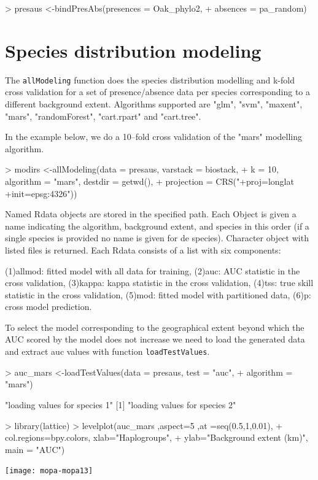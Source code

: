 \documentclass[10pt,a4paper]{report}
\begin{document}
\begin{Schunk}
\begin{Sinput}
> presaus <-bindPresAbs(presences = Oak_phylo2, 
+                       absences = pa_random)
\end{Sinput}
\end{Schunk}


\chapter{Species distribution modeling}


The \texttt{allModeling} function does the species distribution modelling and k-fold cross validation for a set of presence/absence data per species corresponding to a different background 
extent. Algorithms supported are "glm", "svm", "maxent", "mars", "randomForest", "cart.rpart" 
and "cart.tree".

In the example below, we do a 10--fold cross validation of the "mars" modelling algorithm.

\begin{Schunk}
\begin{Sinput}
> modirs <-allModeling(data = presaus, varstack = biostack, 
+               k = 10, algorithm = "mars", destdir = getwd(), 
+               projection = CRS("+proj=longlat +init=epsg:4326"))
\end{Sinput}
\end{Schunk}

Named Rdata objects are stored in the specified path. Each Object is given a name indicating the algorithm, background extent, and species in this order (if a single species is provided no name is given for de species). Character object with listed files is returned. Each Rdata consists of a list with six components:

	(1)allmod: fitted model with all data for training, 
	(2)auc: AUC statistic in the cross validation,
	(3)kappa: kappa statistic in the cross validation,
	(4)tss: true skill statistic in the cross validation,
	(5)mod: fitted model with partitioned data, 
	(6)p: cross model prediction. 


To select the model corresponding to the geographical extent beyond which the AUC scored by the model does not increase we need to load the generated data and extract auc values with function \texttt{loadTestValues}.

\begin{Schunk}
\begin{Sinput}
> auc_mars <-loadTestValues(data = presaus, test = "auc", 
+                           algorithm = "mars")
\end{Sinput}
\begin{Soutput}
[1] "loading values for species 1"
[1] "loading values for species 2"
\end{Soutput}
\begin{Sinput}
> library(lattice)
> levelplot(auc_mars ,aspect=5 ,at =seq(0.5,1,0.01), 
+           col.regions=bpy.colors, xlab="Haplogroups", 
+           ylab="Background extent (km)", main = "AUC")
\end{Sinput}
\end{Schunk}
\texttt{[image: mopa-mopa13]}
\end{document}
